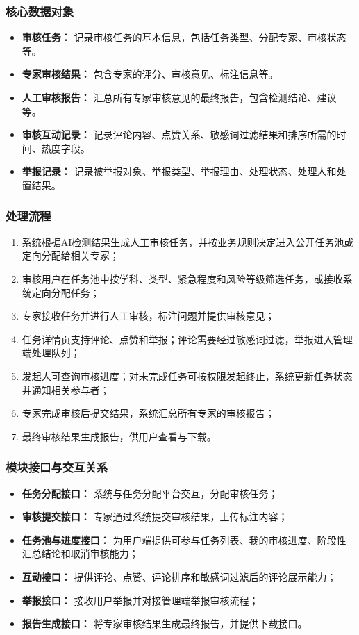 \subsubsection{核心数据对象}
\begin{itemize}[leftmargin=2em]
    \item \textbf{审核任务：} 记录审核任务的基本信息，包括任务类型、分配专家、审核状态等。
    \item \textbf{专家审核结果：} 包含专家的评分、审核意见、标注信息等。
    \item \textbf{人工审核报告：} 汇总所有专家审核意见的最终报告，包含检测结论、建议等。
    \item \textbf{审核互动记录：} 记录评论内容、点赞关系、敏感词过滤结果和排序所需的时间、热度字段。
    \item \textbf{举报记录：} 记录被举报对象、举报类型、举报理由、处理状态、处理人和处置结果。
\end{itemize}

\subsubsection{处理流程}
\begin{enumerate}[leftmargin=2em]
    \item 系统根据AI检测结果生成人工审核任务，并按业务规则决定进入公开任务池或定向分配给相关专家；
    \item 审核用户在任务池中按学科、类型、紧急程度和风险等级筛选任务，或接收系统定向分配任务；
    \item 专家接收任务并进行人工审核，标注问题并提供审核意见；
    \item 任务详情页支持评论、点赞和举报；评论需要经过敏感词过滤，举报进入管理端处理队列；
    \item 发起人可查询审核进度；对未完成任务可按权限发起终止，系统更新任务状态并通知相关参与者；
    \item 专家完成审核后提交结果，系统汇总所有专家的审核报告；
    \item 最终审核结果生成报告，供用户查看与下载。
\end{enumerate}

\subsubsection{模块接口与交互关系}
\begin{itemize}[leftmargin=2em]
    \item \textbf{任务分配接口：} 系统与任务分配平台交互，分配审核任务；
    \item \textbf{审核提交接口：} 专家通过系统提交审核结果，上传标注内容；
    \item \textbf{任务池与进度接口：} 为用户端提供可参与任务列表、我的审核进度、阶段性汇总结论和取消审核能力；
    \item \textbf{互动接口：} 提供评论、点赞、评论排序和敏感词过滤后的评论展示能力；
    \item \textbf{举报接口：} 接收用户举报并对接管理端举报审核流程；
    \item \textbf{报告生成接口：} 将专家审核结果生成最终报告，并提供下载接口。
\end{itemize}

